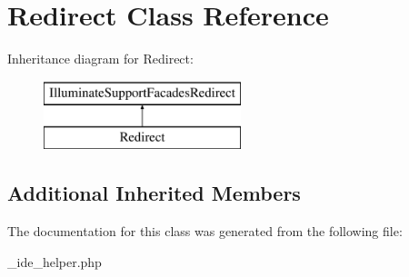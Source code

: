\hypertarget{class_redirect}{}\section{Redirect Class Reference}
\label{class_redirect}
Inheritance diagram for Redirect\+:\begin{figure}[H]
\begin{center}
\leavevmode
\includegraphics[height=2.000000cm]{class_redirect}
\end{center}
\end{figure}
\subsection*{Additional Inherited Members}


The documentation for this class was generated from the following file\+:\begin{DoxyCompactItemize}
\item 
\+\_\+ide\+\_\+helper.\+php\end{DoxyCompactItemize}
